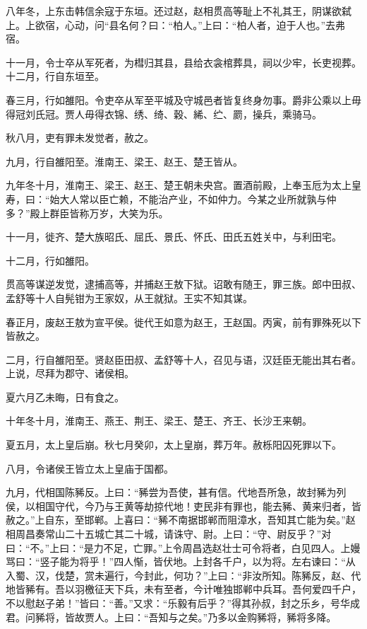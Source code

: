 \documentclass[12pt,UTF8]{ctexbook}
\begin{document}
八年冬，上东击韩信余寇于东垣。还过赵，赵相贯高等耻上不礼其王，阴谋欲弑上。上欲宿，心动，问“县名何？曰：“柏人。”上曰：“柏人者，迫于人也。”去弗宿。



十一月，令士卒从军死者，为槥归其县，县给衣衾棺葬具，祠以少牢，长吏视葬。十二月，行自东垣至。



春三月，行如雒阳。令吏卒从军至平城及守城邑者皆复终身勿事。爵非公乘以上毋得冠刘氏冠。贾人毋得衣锦、绣、绮、穀、絺、纻、罽，操兵，乘骑马。



秋八月，吏有罪未发觉者，赦之。



九月，行自雒阳至。淮南王、梁王、赵王、楚王皆从。



九年冬十月，淮南王、梁王、赵王、楚王朝未央宫。置酒前殿，上奉玉卮为太上皇寿，曰：“始大人常以臣亡赖，不能治产业，不如仲力。今某之业所就孰与仲多？”殿上群臣皆称万岁，大笑为乐。



十一月，徙齐、楚大族昭氏、屈氏、景氏、怀氏、田氏五姓关中，与利田宅。



十二月，行如雒阳。



贯高等谋逆发觉，逮捕高等，并捕赵王敖下狱。诏敢有随王，罪三族。郎中田叔、孟舒等十人自髡钳为王家奴，从王就狱。王实不知其谋。



春正月，废赵王敖为宣平侯。徙代王如意为赵王，王赵国。丙寅，前有罪殊死以下皆赦之。



二月，行自雒阳至。贤赵臣田叔、孟舒等十人，召见与语，汉廷臣无能出其右者。上说，尽拜为郡守、诸侯相。



夏六月乙未晦，日有食之。



十年冬十月，淮南王、燕王、荆王、梁王、楚王、齐王、长沙王来朝。



夏五月，太上皇后崩。秋七月癸卯，太上皇崩，葬万年。赦栎阳囚死罪以下。



八月，令诸侯王皆立太上皇庙于国都。



九月，代相国陈豨反。上曰：“豨尝为吾使，甚有信。代地吾所急，故封豨为列侯，以相国守代，今乃与王黄等劫掠代地！吏民非有罪也，能去豨、黄来归者，皆赦之。”上自东，至邯郸。上喜曰：“豨不南据邯郸而阻漳水，吾知其亡能为矣。”赵相周昌奏常山二十五城亡其二十城，请诛守、尉。上曰：“守、尉反乎？”对曰：“不。”上曰：“是力不足，亡罪。”上令周昌选赵壮士可令将者，白见四人。上嫚骂曰：“竖子能为将乎！”四人惭，皆伏地。上封各千户，以为将。左右谏曰：“从入蜀、汉，伐楚，赏未遍行，今封此，何功？”上曰：“非汝所知。陈豨反，赵、代地皆豨有。吾以羽檄征天下兵，未有至者，今计唯独邯郸中兵耳。吾何爱四千户，不以慰赵子弟！”皆曰：“善。”又求：“乐毅有后乎？”得其孙叔，封之乐乡，号华成君。问豨将，皆故贾人。上曰：“吾知与之矣。”乃多以金购豨将，豨将多降。
\end{document}
